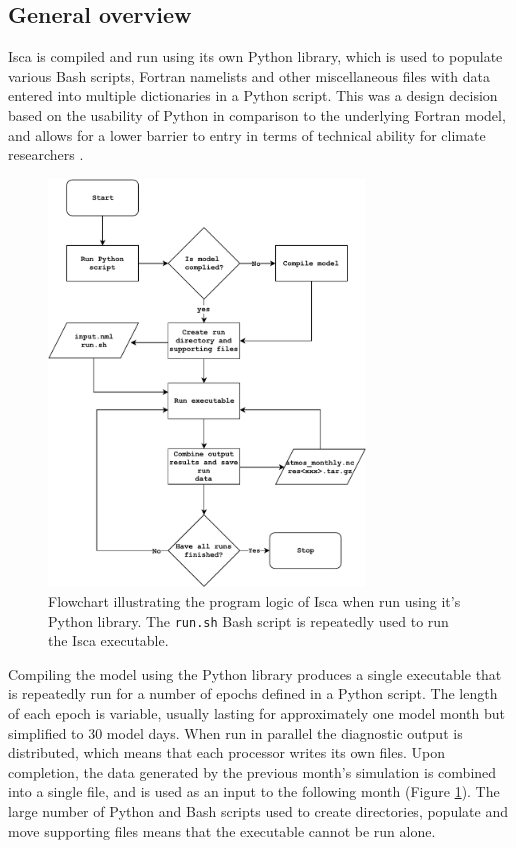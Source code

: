 \documentclass[a4paper,11pt]{report}
\begin{document}
\subsection{General overview}
Isca is compiled and run using its own Python library, which is used to populate various Bash scripts, Fortran namelists and other miscellaneous files with data entered into multiple dictionaries in a Python script. This was a design decision based on the usability of Python in comparison to the underlying Fortran model, and allows for a lower barrier to entry in terms of technical ability for climate researchers \cite{vallis2018isca}. 
\par
\begin{figure}[H]
\begin{center}
\includegraphics[width=0.75\textwidth]{img/isca_flow.pdf}
\caption[Flowchart of the program logic of Isca]{Flowchart illustrating the program logic of Isca when run using it's Python library. The \texttt{run.sh} Bash script is repeatedly used to run the Isca executable.}
\label{fig:flowchart}
\end{center}
\end{figure}
\par
Compiling the model using the Python library produces a single executable that is repeatedly run for a number of epochs defined in a Python script. The length of each epoch is variable, usually lasting for approximately one model month but simplified to 30 model days. When run in parallel the diagnostic output is distributed, which means that each processor writes its own files. Upon completion, the data generated by the previous month's simulation is combined into a single file, and is used as an input to the following month (Figure \ref{fig:flowchart}). The large number of Python and Bash scripts used to create directories, populate and move supporting files means that the executable cannot be run alone.
\end{document}
